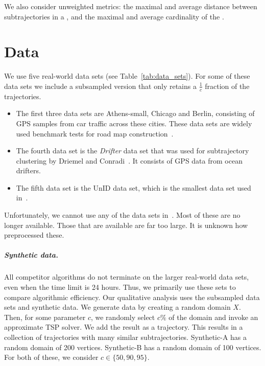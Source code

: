 \documentclass[english, thm-restate]{lipics-v2021}
\begin{document}
\noindent
We also consider unweighted  metrics:
 the maximal and average \frechet distance between subtrajectories in a \pathlet, and
the maximal and average cardinality of the \pathlets.

\section{Data}

We use five real-world data sets (see Table~\ref{tab:data_sets}). For some of these data sets we include a subsampled version that only retains a $\frac{1}{c}$ fraction of the trajectories.

\begin{itemize}
    \item The first three data sets are Athens-small, Chicago and Berlin, consisting of GPS samples from car traffic across these cities.  These data sets are widely used
benchmark tests for road map construction~\cite{ahmed2015comparison, buchin2017clustering, wang2015efficient, huang2018automatic}. 
\item 
The fourth data set is the \emph{Drifter} data set that was used for subtrajectory clustering by Driemel and Conradi~\cite{conradi2023finding}. It consists of GPS data from ocean drifters.
\item The fifth data set is the UnID data set, which is the smallest data set used in~\cite{9827305}. 
\end{itemize}

\noindent
Unfortunately, we cannot use any of the data sets in~\cite{agarwal2018subtrajectory}. Most of these are no longer available.  Those that are available are far too large. It is unknown how~\cite{agarwal2018subtrajectory} preprocessed these. 

\subparagraph{Synthetic data.}
All competitor algorithms do not terminate on the larger real-world data sets, even when the time limit is 24 hours. Thus, we primarily use these sets to  compare algorithmic efficiency. 
Our qualitative analysis uses the subsampled data sets and synthetic data. We generate data by creating a random domain $X$. 
Then, for some parameter $c$, we randomly select $c \%$ of the domain and invoke an approximate TSP solver. We add the result as a trajectory. This results in a collection of trajectories with many similar subtrajectories. 
Synthetic-A has a random domain of 200 vertices. Synthetic-B has a random domain of 100 vertices. For both of these, we consider $c \in \{50, 90, 95\}$.
\end{document}
